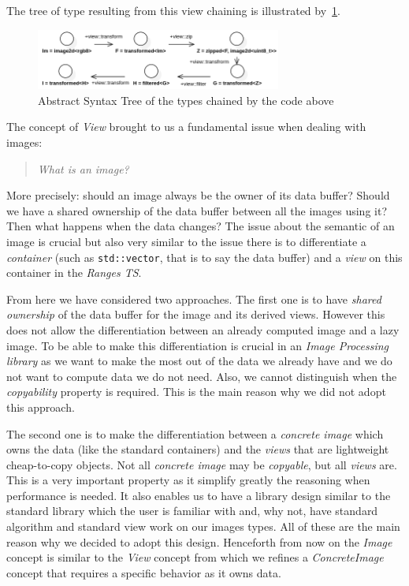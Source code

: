 \noindent The tree of type resulting from this view chaining is illustrated by~\cref{fig.viewAST}.

\begin{figure}[htb]
  \includegraphics[height=2cm]{figs/viewAST.png}
  \caption{Abstract Syntax Tree of the types chained by the code above}
  \label{fig.viewAST}
\end{figure}

The concept of \emph{View} brought to us a fundamental issue when dealing with images: \blockquote{\emph{What is an
    image?}}. More precisely: should an image always be the owner of its data buffer? Should we have a shared ownership of
the data buffer between all the images using it? Then what happens when the data changes? The issue about the semantic
of an image is crucial but also very similar to the issue there is to differentiate a \emph{container} (such as
\texttt{std::vector}, that is to say the data buffer) and a \emph{view} on this container in the \emph{Ranges TS}.

From here we have considered two approaches. The first one is to have \emph{shared ownership} of the data buffer for the
image and its derived views. However this does not allow the differentiation between an already computed image and a
lazy image. To be able to make this differentiation is crucial in an \emph{Image Processing library} as we want to make
the most out of the data we already have and we do not want to compute data we do not need. Also, we cannot distinguish
when the \emph{copyability} property is required. This is the main reason why we did not adopt this approach.

The second one is to make the differentiation between a \emph{concrete image} which owns the data (like the standard
containers) and the \emph{views} that are lightweight cheap-to-copy objects. Not all \emph{concrete image} may be
\emph{copyable}, but all \emph{views} are. This is a very important property as it simplify greatly the reasoning when
performance is needed. It also enables us to have a library design similar to the standard library which the user is
familiar with and, why not, have standard algorithm and standard view work on our images types. All of these are the
main reason why we decided to adopt this design. Henceforth from now on the \emph{Image} concept is similar to the
\emph{View} concept from which we refines a \emph{ConcreteImage} concept that requires a specific behavior as it owns
data.


